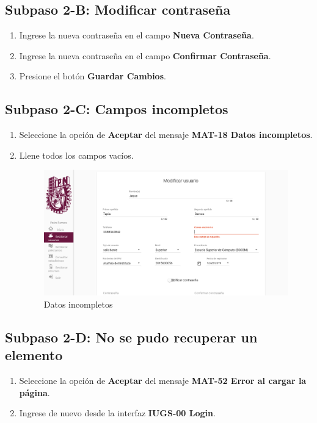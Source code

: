 \subsection{Subpaso 2-B: Modificar contraseña}
\begin{enumerate}
	\item Ingrese la nueva contraseña en el campo \textbf{Nueva Contraseña}.
\item Ingrese la nueva contraseña en el campo \textbf{Confirmar Contraseña}.
\item Presione el botón \textbf{Guardar Cambios}.
\end{enumerate}

\subsection{Subpaso 2-C: Campos incompletos}
\begin{enumerate}
	\item Seleccione la opción de \textbf{Aceptar} del mensaje
\textbf{MAT-18 Datos incompletos}.
	\item Llene todos los campos vacíos.
	\begin{figure}[hbtp]
	\includegraphics[scale=0.3]{images/Interfaz/MAT-18 Datos incompletos2.png}
	\caption{Datos incompletos}
	\end{figure}
\end{enumerate}

\subsection{Subpaso 2-D: No se pudo recuperar un elemento}
\begin{enumerate}
	\item Seleccione la opción de \textbf{Aceptar} del mensaje
\textbf{MAT-52 Error al cargar la página}.
	\item Ingrese de nuevo desde la interfaz 
\textbf{IUGS-00 Login}.
\end{enumerate}


